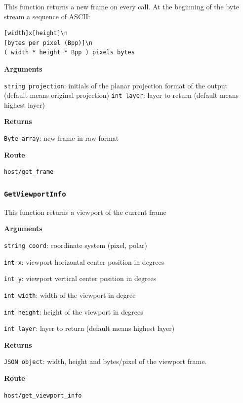 \documentclass{article}
\begin{document}
This function returns a new frame on every call.
At the beginning of the byte stream a sequence of ASCII:
\begin{verbatim}
[width]x[height]\n
[bytes per pixel (Bpp)]\n
( width * height * Bpp ) pixels bytes
\end{verbatim}

\textbf{Arguments}

\texttt{string projection}: initials of the planar projection format of the output (default means original projection)
\texttt{int layer}: layer to return (default means highest layer)

\textbf{Returns}

\texttt{Byte array}: new frame in raw format

\textbf{Route}

\texttt{host/get_frame}


\subsubsection*{\texttt{GetViewportInfo}}

This function returns a viewport of the current frame

\textbf{Arguments}

\texttt{string coord}: coordinate system (pixel, polar)

\texttt{int x}: viewport horizontal center position in degrees

\texttt{int y}: viewport vertical center position in degrees

\texttt{int width}: width of the viewport in degree

\texttt{int height}: height of the viewport in degrees

\texttt{int layer}: layer to return (default means highest layer)

\textbf{Returns}

\texttt{JSON object}: width, height and bytes/pixel of the viewport frame.

\textbf{Route}

\texttt{host/get_viewport_info}

\end{document}
